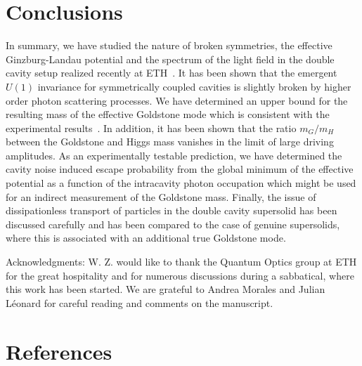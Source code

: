 \documentclass[12pt]{iopart}
\begin{document}
\section{Conclusions}

In summary, we have studied the nature of broken symmetries, the effective Ginzburg-Landau potential and the 
spectrum of the light field in the double cavity setup realized recently at ETH~\cite{leonard2016supersolid,leonard_supersolid_goldstone}. 
It has been shown that the emergent $U(1)$ 
invariance for symmetrically coupled cavities is slightly broken by higher order photon scattering processes. 
We have determined an upper bound for the resulting mass of the effective Goldstone mode which is consistent with the experimental 
results~\cite{leonard_supersolid_goldstone}. In addition, it has been shown
that the ratio $m_G/m_H$ between the Goldstone and Higgs mass vanishes in the limit of large driving amplitudes. 
As an experimentally testable prediction, we have determined the cavity noise induced escape probability from the global minimum 
of the effective potential as a function of the intracavity photon occupation which might be used for an indirect measurement of the Goldstone mass.
Finally, the issue of dissipationless transport of particles in the double cavity supersolid has been discussed carefully and
has been compared to the case of genuine supersolids, where this is associated with an additional true Goldstone mode.


Acknowledgments: W. Z. would like to thank the Quantum Optics group at ETH for the great hospitality and for
numerous discussions during a sabbatical, where this work has been started. We are grateful to Andrea Morales and Julian L{\'e}onard for careful reading and comments on the manuscript.  

\section*{References}


\end{document}
